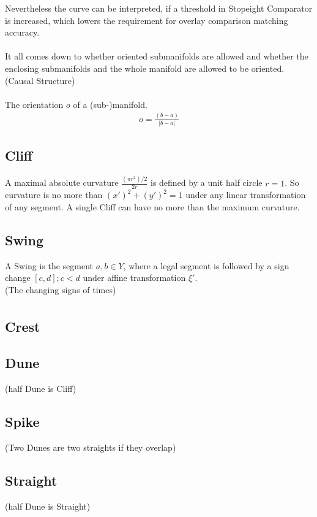 \documentclass{report}
\begin{document}
Nevertheless the curve can be interpreted, if a threshold in Stopeight Comparator is increased, which lowers the requirement for overlay comparison matching accuracy.\\\\
It all comes down to whether oriented submanifolds are allowed and whether the enclosing submanifolds and the whole manifold are allowed to be oriented. (Causal Structure)\\\\
The orientation $o$ of a (sub-)manifold.
\begin{align}
o = \frac{(b-a)}{\lvert b-a \rvert}
\end{align}

\subsection{Cliff}
A maximal absolute curvature $\frac{(\pi r^2) /2}{2r}$ is defined by a unit half circle $r=1$. So curvature is no more than $(x')^2 + (y')^2 =1$  under any linear transformation of any segment.
A single Cliff can have no more than the maximum curvature.

\subsection{Swing}
A Swing is the segment $a,b \in Y$, where a legal segment is followed by a sign change $[c,d]; c<d$ under affine transformation $\xi'$.\\
(The changing signs of times)
\begin{align}
\end{align}

\subsection{Crest}

\subsection{Dune}
(half Dune is Cliff)

\subsection{Spike}
(Two Dunes are two straights if they overlap)

\subsection{Straight}
(half Dune is Straight)
\end{document}
